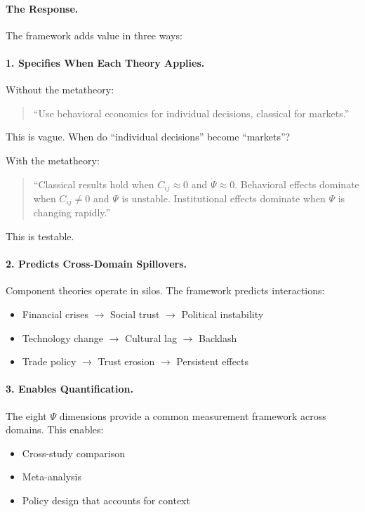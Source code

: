 \documentclass[12pt,a4paper]{article}
\begin{document}
\paragraph{The Response.}
The framework adds value in three ways:

\paragraph{1. Specifies When Each Theory Applies.}
Without the metatheory:
\begin{quote}
``Use behavioral economics for individual decisions, classical for markets.''
\end{quote}
This is vague. When do ``individual decisions'' become ``markets''?

With the metatheory:
\begin{quote}
``Classical results hold when $C_{ij} \approx 0$ and $\dot{\Psi} \approx 0$. Behavioral effects dominate when $C_{ij} \neq 0$ and $\Psi$ is unstable. Institutional effects dominate when $\Psi$ is changing rapidly.''
\end{quote}
This is testable.

\paragraph{2. Predicts Cross-Domain Spillovers.}
Component theories operate in silos. The framework predicts interactions:
\begin{itemize}
    \item Financial crises $\rightarrow$ Social trust $\rightarrow$ Political instability
    \item Technology change $\rightarrow$ Cultural lag $\rightarrow$ Backlash
    \item Trade policy $\rightarrow$ Trust erosion $\rightarrow$ Persistent effects
\end{itemize}

\paragraph{3. Enables Quantification.}
The eight $\Psi$ dimensions provide a common measurement framework across domains. This enables:
\begin{itemize}
    \item Cross-study comparison
    \item Meta-analysis
    \item Policy design that accounts for context
\end{itemize}
\end{document}
